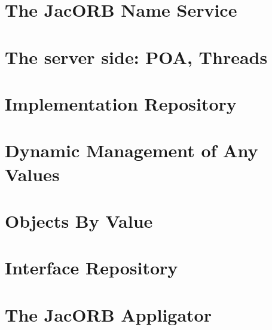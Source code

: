 \documentclass[12pt]{scrbook}
\begin{document}
\chapter{The JacORB Name Service}
\label{ch:naming}




\chapter{The server side: POA, Threads}
\label{ch:POA}




\chapter{Implementation Repository}
\label{Ch_Imr}




\chapter{Dynamic Management of Any Values}
\label{ch:dynany}



\chapter{Objects By Value}
\label{ch:obv}



\chapter{Interface Repository}
\label{ch:interface_repository}



\chapter{The JacORB Appligator}
\label{ch:applets}
\end{document}

